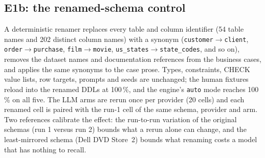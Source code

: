\documentclass[preprint,12pt]{elsarticle}
\begin{document}
\subsection{E1b: the renamed-schema control}
\label{sec:e1bdesign}
A deterministic renamer replaces every table and column identifier (54 table names and 202 distinct column names) with a synonym (\texttt{customer}$\to$\texttt{client}, \texttt{order}$\to$\texttt{purchase}, \texttt{film}$\to$\texttt{movie}, \texttt{us\_states}$\to$\texttt{state\_codes}, and so on), removes the dataset names and documentation references from the business cases, and applies the same synonyms to the case prose. Types, constraints, CHECK value lists, row targets, prompts and seeds are unchanged; the human fixtures reload into the renamed DDLs at 100\,\%, and the engine's \texttt{auto} mode reaches 100\,\% on all five. The LLM arms are rerun once per provider (20 cells) and each renamed cell is paired with the run-1 cell of the same schema, provider and arm. Two references calibrate the effect: the run-to-run variation of the original schemas (run 1 versus run 2) bounds what a rerun alone can change, and the least-mirrored schema (Dell DVD Store~2) bounds what renaming costs a model that has nothing to recall.
\end{document}
